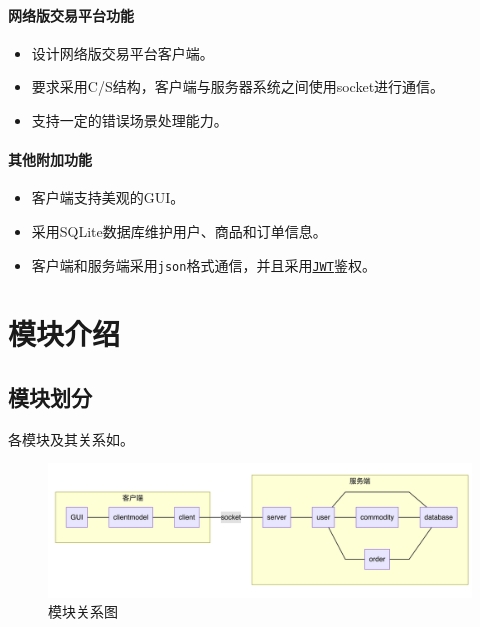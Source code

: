 \documentclass[lang=cn,11pt,a4paper,cite=authornum]{paper}
\begin{document}
\paragraph{网络版交易平台功能}

\begin{itemize}
    \item 设计网络版交易平台客户端。
    \item 要求采用C/S结构，客户端与服务器系统之间使用socket进行通信。
    \item 支持一定的错误场景处理能力。
\end{itemize}

\paragraph{其他附加功能}

\begin{itemize}
    \item 客户端支持美观的GUI。
    \item 采用SQLite数据库维护用户、商品和订单信息。
    \item 客户端和服务端采用\texttt{json}格式通信，并且采用\href{https://jwt.io/}{\texttt{JWT}}鉴权。
\end{itemize}

\section{模块介绍}

\subsection{模块划分}

各模块及其关系如。

\begin{figure}[htbp]

    \centering
    \includegraphics[width=\linewidth]{./Images/structure.png}
    \caption{模块关系图\label{fig:structure}}

\end{figure}
\end{document}
